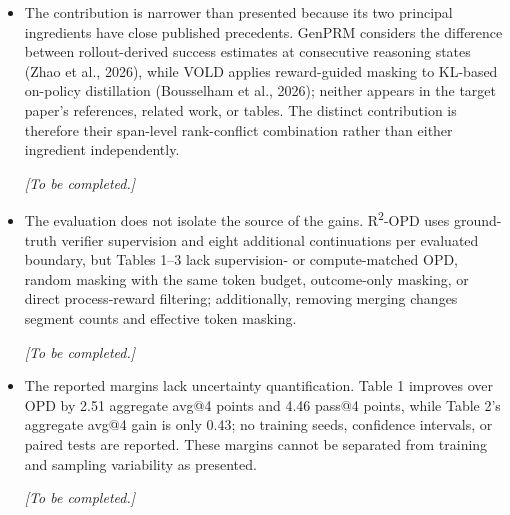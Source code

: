 \documentclass[11pt,a4paper]{article}
\begin{document}
\begin{itemize}
\item The contribution is narrower than presented because its two principal ingredients have close published precedents. GenPRM considers the difference between rollout-derived success estimates at consecutive reasoning states (Zhao et al., 2026), while VOLD applies reward-guided masking to KL-based on-policy distillation (Bousselham et al., 2026); neither appears in the target paper's references, related work, or tables. The distinct contribution is therefore their span-level rank-conflict combination rather than either ingredient independently.
\par{}
\begin{responsebox}[frametitle={Response to W4},nobreak=true]
\textit{[To be completed.]}\par\vspace{1em}
\end{responsebox}

\item The evaluation does not isolate the source of the gains. R\textsuperscript{2}-OPD uses ground-truth verifier supervision and eight additional continuations per evaluated boundary, but Tables 1--3 lack supervision- or compute-matched OPD, random masking with the same token budget, outcome-only masking, or direct process-reward filtering; additionally, removing merging changes segment counts and effective token masking.
\par{}
\begin{responsebox}[frametitle={Response to W5},nobreak=true]
\textit{[To be completed.]}\par\vspace{1em}
\end{responsebox}

\item The reported margins lack uncertainty quantification. Table 1 improves over OPD by 2.51 aggregate avg@4 points and 4.46 pass@4 points, while Table 2's aggregate avg@4 gain is only 0.43; no training seeds, confidence intervals, or paired tests are reported. These margins cannot be separated from training and sampling variability as presented.
\par{}
\begin{responsebox}[frametitle={Response to W6},nobreak=true]
\textit{[To be completed.]}\par\vspace{1em}
\end{responsebox}

\end{itemize}
\end{document}
